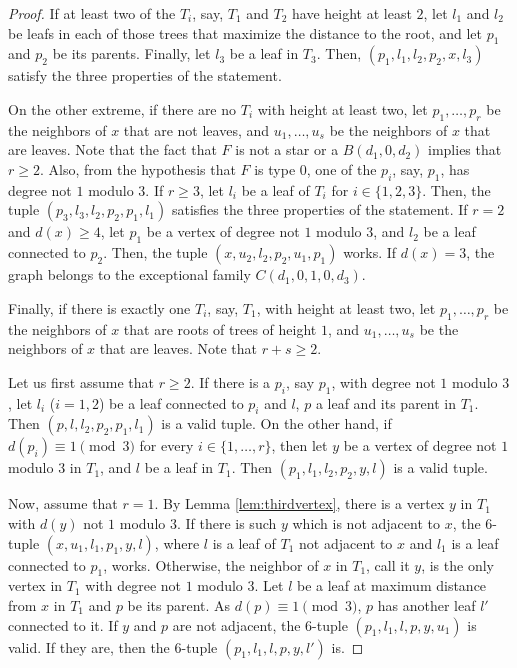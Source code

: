 \documentclass[11pt]{article}
\begin{document}
\begin{proof}
   
    If at least two of the $T_i$, say, $T_1$ and $T_2$ have height at least $2$, let $l_1$ and $l_2$ be leafs in each of those trees that maximize the distance to the root, and let $p_1$ and $p_2$ be its parents. Finally, let $l_3$ be a leaf in $T_3$. Then, $(p_1,l_1,l_2,p_2,x,l_3)$ satisfy the three properties of the statement.

    On the other extreme, if there are no $T_i$ with height at least two, let $p_1,\dots,p_r$ be the neighbors of $x$ that are not leaves, and $u_1,\dots,u_s$ be the neighbors of $x$ that are leaves. Note that the fact that $F$ is not a star or a $B(d_1,0,d_2)$ implies that $r \geq 2$. Also, from the hypothesis that $F$ is type $0$, one of the $p_i$, say, $p_1$, has degree not $1$ modulo $3$. If $r \geq 3$, let $l_i$ be a leaf of $T_i$ for $i \in \{1,2,3\}$. Then, the tuple $(p_3,l_3,l_2,p_2,p_1,l_1)$ satisfies the three properties of the statement. If $r=2$ and $d(x) \geq 4$, let $p_1$ be a vertex of degree not $1$ modulo $3$, and $l_2$ be a leaf connected to $p_2$. Then, the tuple $(x,u_2,l_2,p_2, u_1, p_1)$ works. If $d(x)=3$, the graph belongs to the exceptional family $C(d_1,0,1,0,d_3)$.

    Finally, if there is exactly one $T_i$, say, $T_1$, with height at least two, let $p_1,\dots,p_r$ be the neighbors of $x$ that are roots of trees of height $1$, and $u_1,\dots,u_s$ be the neighbors of $x$ that are leaves. Note that $r + s \geq 2$.

    Let us first assume that $r \geq 2$. If there is a $p_i$, say $p_1$, with degree not $1$ modulo $3$, let $l_i$ ($i=1,2$) be a leaf connected to $p_i$ and $l$, $p$ a leaf and its parent in $T_1$. Then $(p,l,l_2,p_2,p_1,l_1)$ is a valid tuple. On the other hand, if $d(p_i) \equiv 1 \pmod 3$ for every $i \in \{1,\dots,r\}$, then let $y$ be a vertex of degree not $1$ modulo $3$ in $T_1$, and $l$ be a leaf in $T_1$. Then $(p_1,l_1,l_2,p_2,y,l)$ is a valid tuple.

    Now, assume that $r=1$. By Lemma \ref{lem:thirdvertex}, there is a vertex $y$ in $T_1$ with $d(y)$ not $1$ modulo $3$. If there is such $y$ which is not adjacent to $x$, the $6$-tuple $(x,u_1,l_1,p_1,y,l)$, where $l$ is a leaf of $T_1$ not adjacent to $x$ and $l_1$ is a leaf connected to $p_1$, works. Otherwise, the neighbor of $x$ in $T_1$, call it $y$, is the only vertex in $T_1$ with degree not $1$ modulo $3$. Let $l$ be a leaf at maximum distance from $x$ in $T_1$ and $p$ be its parent. As $d(p) \equiv 1 \pmod 3$, $p$ has another leaf $l'$ connected to it. If $y$ and $p$ are not adjacent, the $6$-tuple $(p_1,l_1,l,p,y,u_1)$ is valid. If they are, then the $6$-tuple $(p_1,l_1,l,p,y,l')$ is.


\end{proof}
\end{document}
